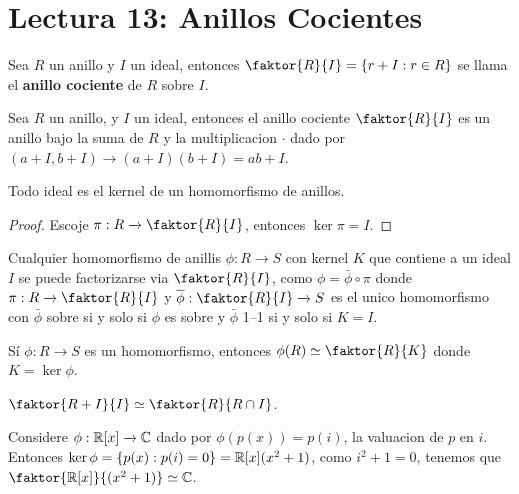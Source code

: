 \section*{Lectura 13: Anillos Cocientes}

\begin{definition}
    Sea $R$ un anillo y $I$ un ideal, entonces $\faktor{R}{I}=\{r+I : r \in R\}$
    se llama el \textbf{anillo cociente} de $R$ sobre $I$.
\end{definition}

\begin{lemma}\label{13.56}
    Sea $R$ un anillo, y  $I$ un ideal, entonces el anillo cociente
    $\faktor{R}{I}$ es un anillo bajo la suma de $R$ y la multiplicacion $\cdot$
    dado por $(a+I,b+I) \xrightarrow{} (a+I)(b+I)=ab+I$.
\end{lemma}

\begin{lemma}\label{13.57}
    Todo ideal es el kernel de un homomorfismo de anillos.
\end{lemma}
\begin{proof}
    Escoje $\pi:R \xrightarrow{} \faktor{R}{I}$, entonces $\ker{\pi}=I$.
\end{proof}

\begin{theorem}\label{13.58}
    Cualquier homomorfismo de anillis $\phi:R \xrightarrow{} S$ con kernel $K$
    que contiene a un ideal  $I$ se puede factorizarse via  $\faktor{R}{I}$,
    como $\phi=\bar{\phi} \circ \pi$ donde $\pi:R \xrightarrow{} \faktor{R}{I}$
    y $\bar{\phi}:\faktor{R}{I} \xrightarrow{} S$ es el unico homomorfismo con
    $\bar{\phi}$ sobre si y solo si $\phi$ es sobre y  $\bar{\phi}$ 1--1 si y
    solo si $K=I$.
\end{theorem}

\begin{theorem}\label{13.59}
    S\'i $\phi:R \xrightarrow{} S$ es un homomorfismo, entonces $\phi(R) \simeq
    \faktor{R}{K}$ donde $K=\ker{\phi}$.
\end{theorem}

\begin{theorem}\label{13.60}
    $\faktor{R+I}{I} \simeq \faktor{R}{R \cap I}$.
\end{theorem}

\begin{example}\label{}
    Considere $\phi:\mathbb{R}[x] \xrightarrow{} \mathbb{C}$ dado por $\phi(p(x))=p(i)$, la
    valuacion de $p$ en $i$. Entonces $\ker{\phi}=\{p(x) : p(i)=0\}=\mathbb{R}[x](x^2+1)$,
    como $i^2+1=0$, tenemos que $\faktor{\R[x]}{(x^2+1)} \simeq \C$.
\end{example}

